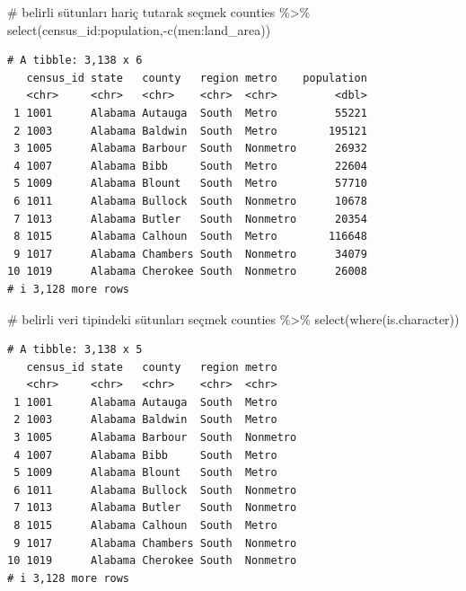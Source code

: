 \documentclass[
  letterpaper,
  DIV=11,
  numbers=noendperiod]{scrreprt}
\newenvironment{Shaded}{\begin{snugshade}}{\end{snugshade}}
\newcommand{\CommentTok}[1]{\textcolor[rgb]{0.37,0.37,0.37}{#1}}
\newcommand{\FunctionTok}[1]{\textcolor[rgb]{0.28,0.35,0.67}{#1}}
\newcommand{\NormalTok}[1]{\textcolor[rgb]{0.00,0.23,0.31}{#1}}
\newcommand{\SpecialCharTok}[1]{\textcolor[rgb]{0.37,0.37,0.37}{#1}}
\begin{document}
\begin{Shaded}
\begin{Highlighting}[]
\CommentTok{\# belirli sütunları hariç tutarak seçmek}
\NormalTok{counties }\SpecialCharTok{\%\textgreater{}\%}
\FunctionTok{select}\NormalTok{(census\_id}\SpecialCharTok{:}\NormalTok{population,}\SpecialCharTok{{-}}\FunctionTok{c}\NormalTok{(men}\SpecialCharTok{:}\NormalTok{land\_area))}
\end{Highlighting}
\end{Shaded}

\begin{verbatim}
# A tibble: 3,138 x 6
   census_id state   county   region metro    population
   <chr>     <chr>   <chr>    <chr>  <chr>         <dbl>
 1 1001      Alabama Autauga  South  Metro         55221
 2 1003      Alabama Baldwin  South  Metro        195121
 3 1005      Alabama Barbour  South  Nonmetro      26932
 4 1007      Alabama Bibb     South  Metro         22604
 5 1009      Alabama Blount   South  Metro         57710
 6 1011      Alabama Bullock  South  Nonmetro      10678
 7 1013      Alabama Butler   South  Nonmetro      20354
 8 1015      Alabama Calhoun  South  Metro        116648
 9 1017      Alabama Chambers South  Nonmetro      34079
10 1019      Alabama Cherokee South  Nonmetro      26008
# i 3,128 more rows
\end{verbatim}

\begin{Shaded}
\begin{Highlighting}[]
\CommentTok{\# belirli veri tipindeki sütunları seçmek}
\NormalTok{counties }\SpecialCharTok{\%\textgreater{}\%}
\FunctionTok{select}\NormalTok{(}\FunctionTok{where}\NormalTok{(is.character))}
\end{Highlighting}
\end{Shaded}

\begin{verbatim}
# A tibble: 3,138 x 5
   census_id state   county   region metro   
   <chr>     <chr>   <chr>    <chr>  <chr>   
 1 1001      Alabama Autauga  South  Metro   
 2 1003      Alabama Baldwin  South  Metro   
 3 1005      Alabama Barbour  South  Nonmetro
 4 1007      Alabama Bibb     South  Metro   
 5 1009      Alabama Blount   South  Metro   
 6 1011      Alabama Bullock  South  Nonmetro
 7 1013      Alabama Butler   South  Nonmetro
 8 1015      Alabama Calhoun  South  Metro   
 9 1017      Alabama Chambers South  Nonmetro
10 1019      Alabama Cherokee South  Nonmetro
# i 3,128 more rows
\end{verbatim}
\end{document}
